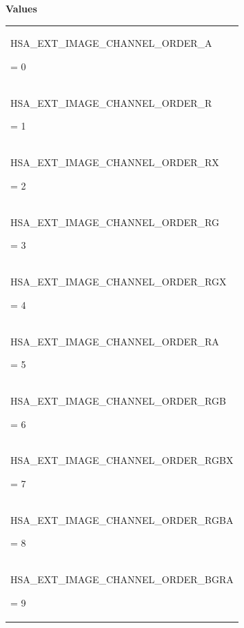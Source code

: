 \documentclass[final]{book}
\newcommand{\reftyp}[1]{#1}
\newcommand{\refenu}[1]{\reftyp{#1}}
\begin{document}
\noindent\textbf{Values}\\[-5mm]
\begin{longtable}{@{\hspace{2em}}p{\linewidth-2em}}
\hspace{-2em}\hypertarget{group__images_1ggabaced4fb1f3b9fdaa978e143af5ff055aa68ce325d9662ff1a1c78598835c8d55}{\refenu{HSA_EXT_IMAGE_CHANNEL_ORDER_A}} = 0\\[2mm]
\hspace{-2em}\hypertarget{group__images_1ggabaced4fb1f3b9fdaa978e143af5ff055ae6f5e256120da86e073db6a996e778d7}{\refenu{HSA_EXT_IMAGE_CHANNEL_ORDER_R}} = 1\\[2mm]
\hspace{-2em}\hypertarget{group__images_1ggabaced4fb1f3b9fdaa978e143af5ff055ad22499f0285b97596caa1a316f839ace}{\refenu{HSA_EXT_IMAGE_CHANNEL_ORDER_RX}} = 2\\[2mm]
\hspace{-2em}\hypertarget{group__images_1ggabaced4fb1f3b9fdaa978e143af5ff055a49185aef99188ff46b53d4da23614798}{\refenu{HSA_EXT_IMAGE_CHANNEL_ORDER_RG}} = 3\\[2mm]
\hspace{-2em}\hypertarget{group__images_1ggabaced4fb1f3b9fdaa978e143af5ff055a59e32fe3e15c24a407c5f1e56a6935f4}{\refenu{HSA_EXT_IMAGE_CHANNEL_ORDER_RGX}} = 4\\[2mm]
\hspace{-2em}\hypertarget{group__images_1ggabaced4fb1f3b9fdaa978e143af5ff055a7ec545d6291f17a9a779b6f673fad718}{\refenu{HSA_EXT_IMAGE_CHANNEL_ORDER_RA}} = 5\\[2mm]
\hspace{-2em}\hypertarget{group__images_1ggabaced4fb1f3b9fdaa978e143af5ff055ae3d2eed3398c973eab1e66e1b92a8efe}{\refenu{HSA_EXT_IMAGE_CHANNEL_ORDER_RGB}} = 6\\[2mm]
\hspace{-2em}\hypertarget{group__images_1ggabaced4fb1f3b9fdaa978e143af5ff055a3d93bdf6b20f6409a9d684646908bfe1}{\refenu{HSA_EXT_IMAGE_CHANNEL_ORDER_RGBX}} = 7\\[2mm]
\hspace{-2em}\hypertarget{group__images_1ggabaced4fb1f3b9fdaa978e143af5ff055a0c5e8dc0eef9af781786ef67ee3702df}{\refenu{HSA_EXT_IMAGE_CHANNEL_ORDER_RGBA}} = 8\\[2mm]
\hspace{-2em}\hypertarget{group__images_1ggabaced4fb1f3b9fdaa978e143af5ff055a8f8724381ae9dfe592a15808ebe8c1d2}{\refenu{HSA_EXT_IMAGE_CHANNEL_ORDER_BGRA}} = 9\\[2mm]

\end{longtable}
\end{document}
